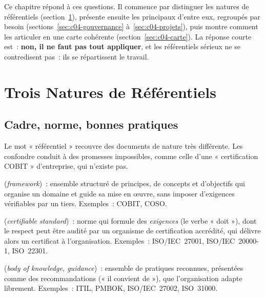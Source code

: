 Ce chapitre répond à ces questions. Il commence par distinguer les natures
de référentiels (section~\ref{sec:c04-natures}), présente ensuite les
principaux d'entre eux, regroupés par besoin
(sections~\ref{sec:c04-gouvernance} à~\ref{sec:c04-projets}), puis montre
comment les articuler en une carte cohérente
(section~\ref{sec:c04-carte}). La réponse courte est~: \textbf{non, il ne
faut pas tout appliquer}, et les référentiels sérieux ne se contredisent
pas~: ils se répartissent le travail.

\separateur

\section{Trois Natures de Référentiels}
\label{sec:c04-natures}

\subsection{Cadre, norme, bonnes pratiques}

Le mot « référentiel » recouvre des documents de nature très différente.
Les confondre conduit à des promesses impossibles, comme celle d'une
« certification COBIT » d'entreprise, qui n'existe pas.

\begin{boxdef}
(\textit{framework})~: ensemble structuré de principes, de concepts et
d'objectifs qui organise un domaine et guide sa mise en œuvre, sans
imposer d'exigences vérifiables par un tiers. Exemples~: COBIT, COSO.

\medskip
{}
(\textit{certifiable standard})~: norme qui formule des \emph{exigences}
(le verbe « doit »), dont le respect peut être audité par un organisme de
certification accrédité, qui délivre alors un certificat à
l'organisation. Exemples~: ISO/IEC~27001, ISO/IEC~20000-1, ISO~22301.

\medskip
{}
(\textit{body of knowledge, guidance})~: ensemble de pratiques reconnues,
présentées comme des recommandations (« il convient de »), que
l'organisation adapte librement. Exemples~: ITIL, PMBOK, ISO/IEC~27002,
ISO~31000.
\end{boxdef}

